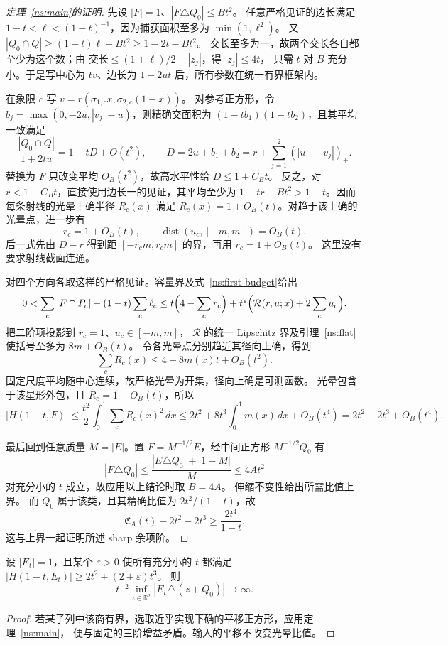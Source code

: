 \begin{proof}[定理~\ref{ns:main}的证明]
先设 $|F|=1$、$|F\triangle Q_0|\le Bt^2$。
任意严格见证的边长满足 $1-t<\ell<(1-t)^{-1}$，因为捕获面积至多为 $\min(1,\ell^2)$。
又 $|Q_0\cap Q|\ge(1-t)\ell-Bt^2\ge1-2t-Bt^2$。
交长至多为一，故两个交长各自都至少为这个数；由
$\text{交长}\le(1+\ell)/2-|z_j|$，得 $|z_j|\le4t$，
只需 $t$ 对 $B$ 充分小。于是写中心为 $tv$、边长为 $1+2ut$ 后，所有参数在统一有界框架内。

在象限 $c$ 写 $v=r(\sigma_{1,c}x,\sigma_{2,c}(1-x))$。
对参考正方形，令 $b_j=\max(0,-2u,|v_j|-u)$，则精确交面积为
$(1-tb_1)(1-tb_2)$，且其平均一致满足
\[
 \frac{|Q_0\cap Q|}{1+2tu}=1-tD+O(t^2),\qquad
 D=2u+b_1+b_2=r+\sum_{j=1}^2(|u|-|v_j|)_+.
\]
替换为 $F$ 只改变平均 $O_B(t^2)$，故高水平性给 $D\le1+C_Bt$。
反之，对 $r<1-C_Bt$，直接使用边长一的见证，其平均至少为
$1-tr-Bt^2>1-t$。因而每条射线的光晕上确半径 $R_c(x)$ 满足
$R_c(x)=1+O_B(t)$。对趋于该上确的光晕点，进一步有
\[
 r_c=1+O_B(t),\qquad
 \operatorname{dist}(u_c,[-m,m])=O_B(t).
\]
后一式先由 $D-r$ 得到距 $[-r_cm,r_cm]$ 的界，再用 $r_c=1+O_B(t)$。
这里没有要求射线截面连通。

对四个方向各取这样的严格见证。容量界及式~\eqref{ns:first-budget}给出
\[
 0<\sum_c|F\cap P_c|-(1-t)\sum_c\ell_c
 \le t\Bigl(4-\sum_cr_c\Bigr)
      +t^2\Bigl(\mathcal R(r,u;x)+2\sum_cu_c\Bigr).
\]
把二阶项投影到 $r_c=1$、$u_c\in[-m,m]$，
$\mathcal R$ 的统一 Lipschitz 界及引理~\ref{ns:flat}使括号至多为 $8m+O_B(t)$。
令各光晕点分别趋近其径向上确，得到
\[
 \sum_cR_c(x)\le4+8m(x)t+O_B(t^2).
\]
固定尺度平均随中心连续，故严格光晕为开集，径向上确是可测函数。
光晕包含于该星形外包，且 $R_c=1+O_B(t)$，所以
\[
 |H(1-t,F)|\le\frac{t^2}{2}\int_0^1\sum_cR_c(x)^2\,dx
 \le2t^2+8t^3\int_0^1m(x)\,dx+O_B(t^4)
 =2t^2+2t^3+O_B(t^4).
\]

最后回到任意质量 $M=|E|$。置 $F=M^{-1/2}E$，经中间正方形 $M^{-1/2}Q_0$ 有
\[
 |F\triangle Q_0|\le\frac{|E\triangle Q_0|+|1-M|}{M}
 \le4At^2
\]
对充分小的 $t$ 成立，故应用以上结论时取 $B=4A$。
伸缩不变性给出所需比值上界。
而 $Q_0$ 属于该类，且其精确比值为 $2t^2/(1-t)$，故
\[
 \mathfrak C_A(t)-2t^2-2t^3\ge\frac{2t^4}{1-t}.
\]
这与上界一起证明所述 sharp 余项阶。
\end{proof}

\begin{corollary}[改善三阶项的必要逃逸]\label{ns:escape}
设 $|E_t|=1$，且某个 $\varepsilon>0$ 使所有充分小的 $t$ 都满足
$|H(1-t,E_t)|\ge2t^2+(2+\varepsilon)t^3$。
则
\[
 t^{-2}\inf_{z\in\mathbb R^2}|E_t\triangle(z+Q_0)|\longrightarrow\infty.
\]
\end{corollary}
\begin{proof}
若某子列中该商有界，选取近乎实现下确的平移正方形，应用定理~\ref{ns:main}，
便与固定的三阶增益矛盾。输入的平移不改变光晕比值。
\end{proof}

